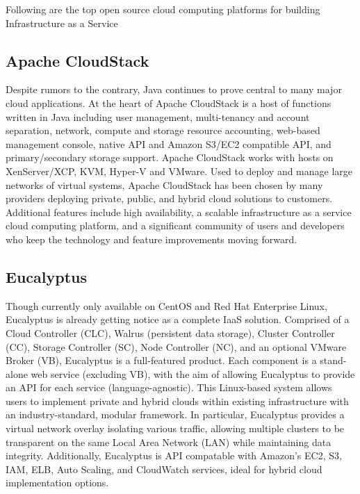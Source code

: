     \par Following are the top open source cloud computing platforms\cite{top} for building Infrastructure as a Service
    
        \subsection{Apache CloudStack}
        \par Despite rumors to the contrary, Java continues to prove central to many major cloud applications. At the heart of Apache CloudStack is a host of functions written in Java including user management, multi-tenancy and account separation, network, compute and storage resource accounting, web-based management console, native API and Amazon S3/EC2 compatible API, and primary/secondary storage support. Apache CloudStack works with hosts on XenServer/XCP, KVM, Hyper-V and VMware. Used to deploy and manage large networks of virtual systems, Apache CloudStack has been chosen by many providers deploying private, public, and hybrid cloud solutions to customers. Additional features include high availability, a scalable infrastructure as a service cloud computing platform, and a significant community of users and developers who keep the technology and feature improvements moving forward.
        
        \subsection{Eucalyptus}
        
        \par Though currently only available on CentOS and Red Hat Enterprise Linux, Eucalyptus is already getting notice as a complete IaaS solution. Comprised of a Cloud Controller (CLC), Walrus (persistent data storage), Cluster Controller (CC), Storage Controller (SC), Node Controller (NC), and an optional VMware Broker (VB), Eucalyptus is a full-featured product. Each component is a stand-alone web service (excluding VB), with the aim of allowing Eucalyptus to provide an API for each service (language-agnostic). This Linux-based system allows users to implement private and hybrid clouds within existing infrastructure with an industry-standard, modular framework. In particular, Eucalyptus provides a virtual network overlay isolating various traffic, allowing multiple clusters to be transparent on the same Local Area Network (LAN) while maintaining data integrity. Additionally, Eucalyptus is API compatable with Amazon’s EC2, S3, IAM, ELB, Auto Scaling, and CloudWatch services, ideal for hybrid cloud implementation options.
    
